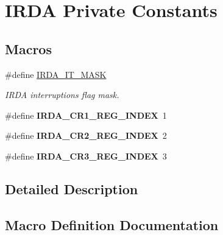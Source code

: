\hypertarget{group___i_r_d_a___private___constants}{}\section{I\+R\+DA Private Constants}
\label{group___i_r_d_a___private___constants}
\subsection*{Macros}
\begin{DoxyCompactItemize}
\item 
\#define \hyperlink{group___i_r_d_a___private___constants_ga38eeb904e4117f70c18bf3767c7ba4a6}{I\+R\+D\+A\+\_\+\+I\+T\+\_\+\+M\+A\+SK}
\begin{DoxyCompactList}\small\item\em I\+R\+DA interruptions flag mask. \end{DoxyCompactList}\item 
\#define {\bfseries I\+R\+D\+A\+\_\+\+C\+R1\+\_\+\+R\+E\+G\+\_\+\+I\+N\+D\+EX}~1\hypertarget{group___i_r_d_a___private___constants_ga799eee8339618346ae69e3f55f274dd6}{}\label{group___i_r_d_a___private___constants_ga799eee8339618346ae69e3f55f274dd6}

\item 
\#define {\bfseries I\+R\+D\+A\+\_\+\+C\+R2\+\_\+\+R\+E\+G\+\_\+\+I\+N\+D\+EX}~2\hypertarget{group___i_r_d_a___private___constants_ga46fd00b4edb980ea631e226c6d0038a7}{}\label{group___i_r_d_a___private___constants_ga46fd00b4edb980ea631e226c6d0038a7}

\item 
\#define {\bfseries I\+R\+D\+A\+\_\+\+C\+R3\+\_\+\+R\+E\+G\+\_\+\+I\+N\+D\+EX}~3\hypertarget{group___i_r_d_a___private___constants_gacc15475a6d02207010b35a1fb88ee619}{}\label{group___i_r_d_a___private___constants_gacc15475a6d02207010b35a1fb88ee619}

\end{DoxyCompactItemize}


\subsection{Detailed Description}


\subsection{Macro Definition Documentation}
